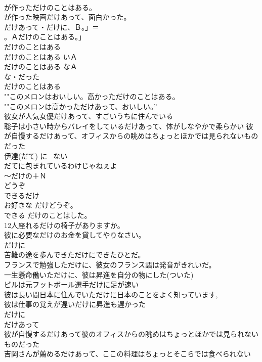 \documentclass[8pt]{extreport}
\begin{document}
\begin{CJK}{UTF8}{min}
\\	が作っただけのことはある。 
\\	が作った映画だけあって、面白かった。 
\\	だけあって・だけに、Ｂ。」＝
\\	。Ａだけのことはある。」 
\\	だけのことはある 
\\	だけのことはある いＡ 
\\	だけのことはある なＡ 
\\	な・だった 
\\	だけのことはある
\\	""このメロンはおいしい。高かっただけのことはある。
\\	""このメロンは高かっただけあって、おいしい。” 
\\	彼女が人気女優だけあって、すごいうちに住んでいる
\\	聡子は小さい時からバレイをしているだけあって、体がしなやかで柔らかい 彼が自慢するだけあって、オフィスからの眺めはちょっとほかでは見られないものだった 
\\	伊達(だて) に~ ない 
\\	だてに包まれているわけじゃねぇよ 
\\	～だけの＋Ｎ 
\\	どうぞ 
\\	できるだけ	
\\	お好きな だけどうぞ。 
\\	できる だけのことはした。 
\\	12人座れるだけの椅子がありますか。 
\\	彼に必要なだけのお金を貸してやりなさい。 
\\	だけに 
\\	苦難の途を歩んできただけにできたひとだ。 
\\	フランスで勉強しただけに、彼女のフランス語は発音がきれいだ。 
\\	一生懸命働いただけに、彼は昇進を自分の物にした(ついた) 
\\	ビルは元フットボール選手だけに足が速い 
\\	彼は長い間日本に住んでいただけに日本のことをよく知っています, 
\\	彼は仕事の覚えが遅いだけに昇進も遅かった 
\\	だけに 
\\	だけあって 
\\	彼が自慢するだけあって彼のオフィスからの眺めはちょっとほかでは見られないものだった 
\\	吉岡さんが薦めるだけあって、ここの料理はちょっとそこらでは食べられない 

\end{CJK}
\end{document}
